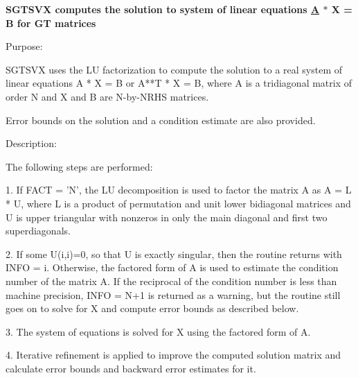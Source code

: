 {\bfseries  S\+G\+T\+S\+V\+X computes the solution to system of linear equations \hyperlink{classA}{A} $\ast$ X = B for G\+T matrices {\bfseries  }}

 \begin{DoxyParagraph}{Purpose\+: }
\begin{DoxyVerb} SGTSVX uses the LU factorization to compute the solution to a real
 system of linear equations A * X = B or A**T * X = B,
 where A is a tridiagonal matrix of order N and X and B are N-by-NRHS
 matrices.

 Error bounds on the solution and a condition estimate are also
 provided.\end{DoxyVerb}
 
\end{DoxyParagraph}
\begin{DoxyParagraph}{Description\+: }
\begin{DoxyVerb} The following steps are performed:

 1. If FACT = 'N', the LU decomposition is used to factor the matrix A
    as A = L * U, where L is a product of permutation and unit lower
    bidiagonal matrices and U is upper triangular with nonzeros in
    only the main diagonal and first two superdiagonals.

 2. If some U(i,i)=0, so that U is exactly singular, then the routine
    returns with INFO = i. Otherwise, the factored form of A is used
    to estimate the condition number of the matrix A.  If the
    reciprocal of the condition number is less than machine precision,
    INFO = N+1 is returned as a warning, but the routine still goes on
    to solve for X and compute error bounds as described below.

 3. The system of equations is solved for X using the factored form
    of A.

 4. Iterative refinement is applied to improve the computed solution
    matrix and calculate error bounds and backward error estimates
    for it.\end{DoxyVerb}
 
\end{DoxyParagraph}

